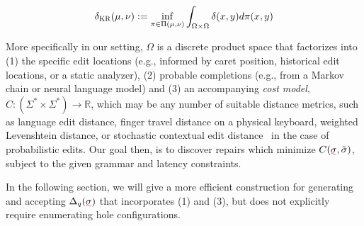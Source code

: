 \documentclass[sigplan,review,anonymous,acmsmall]{acmart}\settopmatter{printfolios=false,printccs=false,printacmref=false}
\begin{document}
\begin{align}
    \delta_{\textsc{KR}}(\mu, \nu) := \inf_{\pi\in \Pi(\mu, \nu)}\int_{\Omega\times \Omega} \delta(x, y)d\pi(x, y)
\end{align}

More specifically in our setting, $\Omega$ is a discrete product space that factorizes into (1) the specific edit locations (e.g., informed by caret position, historical edit locations, or a static analyzer), (2) probable completions (e.g., from a Markov chain or neural language model) and (3) an accompanying \textit{cost model}, $C: (\Sigma^* \times \Sigma^*) \rightarrow \mathbb{R}$, which may be any number of suitable distance metrics, such as language edit distance, finger travel distance on a physical keyboard, weighted Levenshtein distance, or stochastic contextual edit distance~\cite{cotterell+al.acl14} in the case of probabilistic edits. Our goal then, is to discover repairs which minimize $C(\err{\sigma}, \tilde{\sigma})$, subject to the given grammar and latency constraints.

In the following section, we will give a more efficient construction for generating and accepting $\Delta_{q}(\err{\sigma})$ that incorporates (1) and (3), but does not explicitly require enumerating hole configurations.%

%
%
\end{document}
